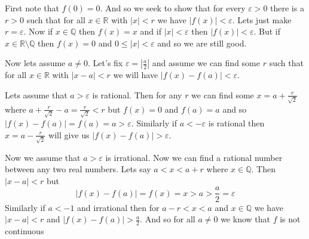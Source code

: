\documentclass[letterpaper]{article}
\begin{document}
\begin{enumerate}
\begin{enumerate}
    First note that $f(0)=0$. And so we seek to show that for every $\varepsilon>0$ there is a $r>0$ such that for all $x\in \mathbb{R}$ with $|x|<r$ we have $|f(x)|<\varepsilon$. Lets just make $r=\varepsilon$. Now if $x\in \mathbb{Q}$ then $f(x)=x$ and if $|x|<\varepsilon$ then $|f(x)|<\varepsilon$. But if $x\in \mathbb{R}\setminus\mathbb{Q}$ then $f(x)=0$ and $0\le|x|<\varepsilon$ and so we are still good.

    Now lets assume $a\ne 0$. Let's fix $\varepsilon=|\frac{a}{2}|$ and assume we can find some $r$ such that for all $x\in \mathbb{R}$ with $|x-a|<r$ we will have $|f(x)-f(a)|<\varepsilon$.

    Lets assume that $a>\varepsilon$ is rational. Then for any $r$ we can find some $x=a+\frac{r}{\sqrt{2}}$ where $a+\frac{r}{\sqrt{2}}-a=\frac{r}{\sqrt{2}}<r$ but $f(x)=0$ and $f(a)=a$ and so $|f(x)-f(a)|=f(a)=a>\varepsilon$. Similarly if $a<-\varepsilon$ is rational then $x=a-\frac{r}{\sqrt{2}}$ will give us $|f(x)-f(a)|>\varepsilon$.

    Now we assume that $a>\varepsilon$ is irrational. Now we can find a rational number between any two real numbers. Lets say $a<x<a+r$ where $x\in \mathbb{Q}$. Then $|x-a|<r$ but
    \[|f(x)-f(a)|=f(x)=x>a>\frac{a}{2}=\varepsilon\]
    Similarly if $a<-1$ and irrational then for $a-r<x<a$ and $x\in \mathbb{Q}$ we have $|x-a|<r$ and $|f(x)-f(a)|>\frac{a}{2}$. And so for all $a\ne 0$ we know that $f$ is not continuous
  \end{enumerate}
\end{enumerate}
\end{document}
